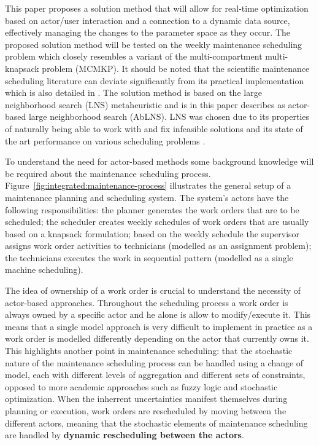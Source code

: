 This paper proposes a solution method that will allow for real-time optimization
based on actor/user interaction and a connection to a dynamic data source,
effectively managing the changes to the parameter space as they occur. The proposed solution
method will be tested on the weekly maintenance scheduling problem \citet{palmerMaintenancePlanningScheduling2019} 
which closely resembles a variant of the multi-compartment multi-knapsack problem (MCMKP). It
should be noted that the scientific maintenance scheduling literature can deviate
significantly from its practical implementation which is also detailed in
\citep{palmerMaintenancePlanningScheduling2019}. The solution method is
based on the large neighborhood search (LNS) metaheuristic and is in this 
paper describes as actor-based large neighborhood search (AbLNS). LNS 
was chosen due to its properties of naturally being able to work with and fix
infeasible solutions and its state of the art performance on various scheduling
problems \citep{gendreauHandbookMetaheuristics2019}. 

To understand the need for actor-based methods some
background knowledge will be required about the maintenance scheduling process.
Figure~\ref{fig:integrated:maintenance-process} illustrates the general setup
of a maintenance planning and scheduling system. The system's actors
have the following responsibilities: the planner generates the work orders that
are to be scheduled; the scheduler creates weekly schedules of work orders that are 
usually based on a knapsack
formulation; based on the weekly schedule the supervisor assigns work order
activities to technicians (modelled as an assignment problem); the
technicians executes the work in sequential pattern (modelled as a single machine scheduling).

The idea of ownership of a work order is crucial to understand the necessity of 
actor-based approaches. Throughout the scheduling process a
work order is always owned by a specific actor and he alone is allow to modify/execute it. This
means that a single model approach is very difficult to implement in practice
as a work order is modelled differently depending on the actor that currently
owns it. This highlights another point in maintenance scheduling: that
the stochastic nature of the maintenance scheduling process can be handled using
a change of model, each with different levels of aggregation and different sets
of constraints, opposed to more academic approaches such as fuzzy logic and
stochastic optimization. When the inherrent uncertainties manifest themselves
during planning or execution, work orders are rescheduled by moving between
the different actors, meaning that the stochastic elements of maintenance
scheduling are handled by \textbf{dynamic rescheduling between the actors}.

